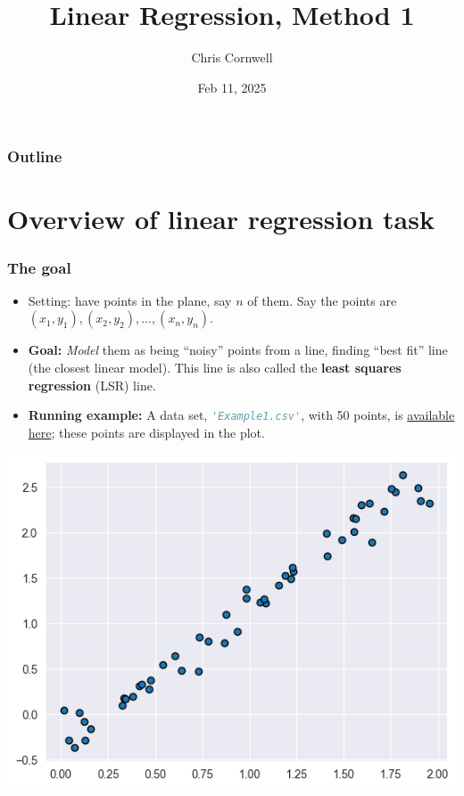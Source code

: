 \documentclass{beamer}
\author{Chris Cornwell}
\date{Feb 11, 2025}
\title{Linear Regression, Method 1}
\theoremstyle{example}
\begin{document}
\begin{frame}
\titlepage
\end{frame}

\begin{frame}
\frametitle{Outline}
\tableofcontents
\end{frame}

\section{Overview of linear regression task}

\begin{frame}[fragile]
\frametitle{The goal}
\begin{itemize}
    \item Setting: have points in the plane, say $n$ of them. Say the points are $(x_1,y_1), (x_2,y_2), \ldots, (x_n,y_n)$.
    \item \textbf{Goal:} \emph{Model} them as being ``noisy'' points from a line, finding ``best fit'' line (the closest linear model). This line is also called the \textbf{least squares regression} (LSR) line.
    \pause
    \item \textbf{Running example:} A data set, \lstinline[language=Python, stringstyle=\ttfamily\color{strings}]{'Example1.csv'}, with 50 points, is \href{https://github.com/cornwell/math371-S25/blob/main/DataSets/}{available here}; these points are displayed in the plot.
\end{itemize}

\vspace*{12pt}
\centering
\includegraphics[height=0.3\textheight]{example1.png}

\end{frame}
\end{document}
